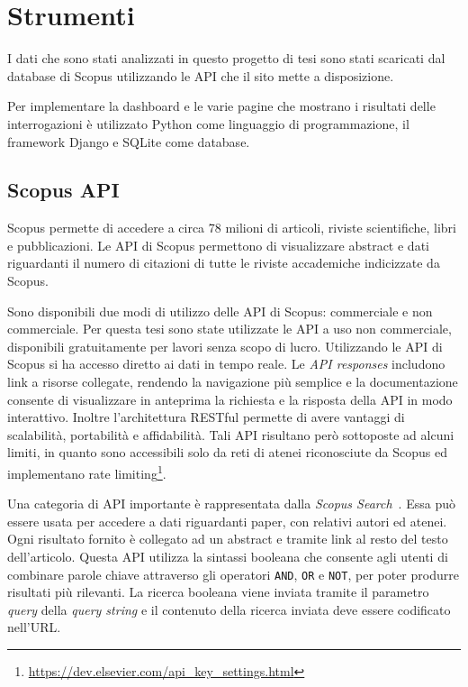 \section{Strumenti}

I dati che sono stati analizzati in questo progetto di tesi sono stati scaricati
dal database di Scopus utilizzando le API che il sito mette a disposizione.

Per implementare la dashboard e le varie pagine che mostrano i risultati delle
interrogazioni è utilizzato Python come linguaggio di programmazione, il
framework Django e SQLite come database.

\subsection{Scopus API}

Scopus permette di accedere a circa 78 milioni di articoli, riviste
scientifiche, libri e pubblicazioni. Le API di Scopus permettono di visualizzare
abstract e dati riguardanti il numero di citazioni di tutte le riviste
accademiche indicizzate da Scopus.

Sono disponibili due modi di utilizzo delle API di Scopus: commerciale e
non commerciale. Per questa tesi sono state utilizzate le API a uso non
commerciale, disponibili gratuitamente per lavori senza scopo di lucro.
Utilizzando le API di Scopus si ha accesso diretto ai dati in tempo
reale. Le \textit{API responses} includono link a risorse collegate, rendendo
la navigazione più semplice e la documentazione consente di visualizzare in
anteprima la richiesta e la risposta della API in modo interattivo. Inoltre
l'architettura RESTful permette di avere vantaggi di scalabilità, portabilità
e affidabilità.
Tali API risultano però sottoposte ad alcuni limiti, in quanto sono accessibili
solo da reti di atenei riconosciute da Scopus ed implementano rate limiting\footnote{\url{https://dev.elsevier.com/api_key_settings.html}}.

Una categoria di API importante è rappresentata dalla \textit{Scopus Search}~\cite{scopussearch}.
Essa può essere usata per accedere a dati riguardanti
paper, con relativi autori ed atenei. Ogni risultato fornito è collegato ad un
abstract e tramite link al resto del testo dell'articolo.
Questa API utilizza la sintassi booleana che consente agli utenti di combinare
parole chiave attraverso gli operatori \texttt{AND}, \texttt{OR} e \texttt{NOT},
per poter produrre risultati  più rilevanti. La ricerca booleana viene inviata
tramite il parametro \textit{query} della \textit{query string} e il contenuto
della ricerca inviata deve essere  codificato nell'URL.

